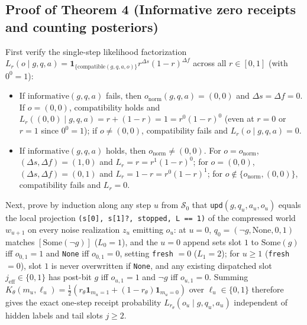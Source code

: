 \documentclass[11pt,a4paper]{article}
\providecommand{\tightlist}{\setlength{\itemsep}{2pt}\setlength{\parskip}{0pt}}
\begin{document}
\subsection{Proof of Theorem 4 (Informative zero receipts and counting
posteriors)}\label{proof-of-theorem-4-informative-zero-receipts-and-counting-posteriors}

First verify the single-step likelihood factorization
\(L_r(o \mid g, q, a) = \mathbf{1}_{\{\mathrm{compatible}(g,q,a,o)\}} r^{\Delta s}(1-r)^{\Delta f}\)
across all \(r \in [0,1]\) (with \(0^0 = 1\)):

\begin{itemize}
\tightlist
\item
  If \(\mathrm{informative}(g, q, a)\) fails, then
  \(o_{\mathrm{norm}}(g, q, a) = (0,0)\) and
  \(\Delta s = \Delta f = 0\). If \(o = (0,0)\), compatibility holds and
  \(L_r((0,0) \mid g, q, a) = r + (1 - r) = 1 = r^0 (1 - r)^0\) (even at
  \(r = 0\) or \(r = 1\) since \(0^0 = 1\)); if \(o \neq (0,0)\),
  compatibility fails and \(L_r(o \mid g, q, a) = 0\).
\item
  If \(\mathrm{informative}(g, q, a)\) holds, then
  \(o_{\mathrm{norm}} \neq (0,0)\). For \(o = o_{\mathrm{norm}}\),
  \((\Delta s, \Delta f) = (1, 0)\) and \(L_r = r = r^1 (1 - r)^0\); for
  \(o = (0,0)\), \((\Delta s, \Delta f) = (0, 1)\) and
  \(L_r = 1 - r = r^0 (1 - r)^1\); for
  \(o \notin \{o_{\mathrm{norm}}, (0,0)\}\), compatibility fails and
  \(L_r = 0\).
\end{itemize}

Next, prove by induction along any step \(u\) from \(\mathcal{S}_0\)
that \texttt{upd}\((g, q_u, a_u, o_u)\) equals the local projection
\texttt{(s{[}0{]},\ s{[}1{]}?,\ stopped,\ L\ ==\ 1)} of the compressed
world \(w_{u+1}\) on every noise realization \(z_u\) emitting \(o_u\):
at \(u = 0\), \(q_0 = (\neg g, \mathrm{None}, 0, 1)\) matches
\([\mathrm{Some}(\neg g)]\) (\(L_0 = 1\)), and the \(u=0\) append sets
slot \(1\) to \(\mathrm{Some}(g)\) iff \(o_{0,1} = 1\) and \texttt{None}
iff \(o_{0,1} = 0\), setting \texttt{fresh} \(= 0\) (\(L_1 = 2\)); for
\(u \ge 1\) (\texttt{fresh} \(= 0\)), slot \(1\) is never overwritten if
\texttt{None}, and any existing dispatched slot
\(j_{\mathrm{eff}} \in \{0,1\}\) has post-bit \(g\) iff \(o_{u,1} = 1\)
and \(\neg g\) iff \(o_{u,1} = 0\). Summing
\(K_\theta(m_u, \ell_u) = \frac{1}{2}(r_\theta \mathbf{1}_{m_u=1} + (1-r_\theta)\mathbf{1}_{m_u=0})\)
over \(\ell_u \in \{0,1\}\) therefore gives the exact one-step receipt
probability \(L_{r_\theta}(o_u \mid g, q_u, a_u)\) independent of hidden
labels and tail slots \(j \ge 2\).
\end{document}
